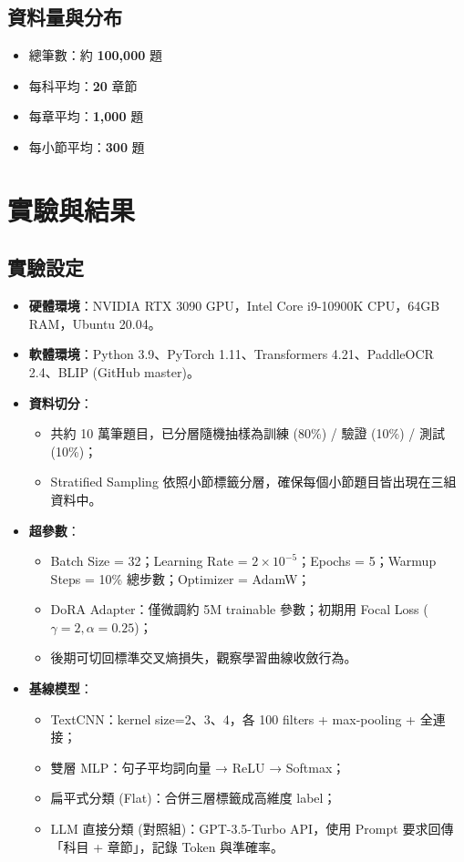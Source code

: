 \documentclass[10pt,conference]{IEEEtran}
\begin{document}
\begin{CJK}{UTF8}{bsmi}
\subsection{資料量與分布}
\begin{itemize}[nosep]
  \item 總筆數：約 \textbf{100,000} 題
  \item 每科平均：\textbf{20} 章節
  \item 每章平均：\textbf{1,000} 題
  \item 每小節平均：\textbf{300} 題
\end{itemize}

\section{實驗與結果}

\subsection{實驗設定}
\begin{itemize}
  \item \textbf{硬體環境}：NVIDIA RTX 3090 GPU，Intel Core i9-10900K CPU，64GB RAM，Ubuntu 20.04。  
  \item \textbf{軟體環境}：Python 3.9、PyTorch 1.11、Transformers 4.21、PaddleOCR 2.4、BLIP (GitHub master)。  
  \item \textbf{資料切分}：  
    \begin{itemize}
      \item 共約 10 萬筆題目，已分層隨機抽樣為訓練 (80\%) / 驗證 (10\%) / 測試 (10\%)；  
      \item Stratified Sampling 依照小節標籤分層，確保每個小節題目皆出現在三組資料中。
    \end{itemize}
  \item \textbf{超參數}：  
    \begin{itemize}
      \item Batch Size = 32；Learning Rate = $2\times10^{-5}$；Epochs = 5；Warmup Steps = 10\% 總步數；Optimizer = AdamW；  
      \item DoRA Adapter：僅微調約 5M trainable 參數；初期用 Focal Loss ($\gamma=2,\alpha=0.25$)；  
      \item 後期可切回標準交叉熵損失，觀察學習曲線收斂行為。
    \end{itemize}
  \item \textbf{基線模型}：  
    \begin{itemize}
      \item TextCNN：kernel size=2、3、4，各 100 filters + max-pooling + 全連接；  
      \item 雙層 MLP：句子平均詞向量 → ReLU → Softmax；  
      \item 扁平式分類 (Flat)：合併三層標籤成高維度 label；  
      \item LLM 直接分類 (對照組)：GPT-3.5-Turbo API，使用 Prompt 要求回傳「科目 + 章節」，記錄 Token 與準確率。
    \end{itemize}
\end{itemize}


\end{CJK}
\end{document}
